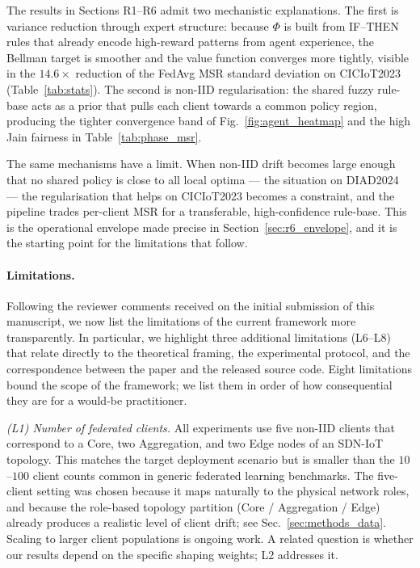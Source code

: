 \documentclass[ai,article,submit,moreauthors,pdftex]{Definitions/mdpi}
\newcommand{\rev}[1]{#1}
\begin{document}
The results in Sections R1--R6 admit two mechanistic explanations.
The first is variance reduction through expert structure: because
$\Phi$ is built from IF--THEN rules that already encode high-reward
patterns from agent experience, the Bellman target is smoother and
the value function converges more tightly, visible in the
$14.6\times$ reduction of the FedAvg MSR standard deviation on
CICIoT2023 (Table~\ref{tab:stats}). The second is non-IID
regularisation: the shared fuzzy rule-base acts as a prior that
pulls each client towards a common policy region, producing the
tighter convergence band of Fig.~\ref{fig:agent_heatmap} and the
high Jain fairness in Table~\ref{tab:phase_msr}.

The same mechanisms have a limit. When non-IID drift becomes large
enough that no shared policy is close to all local optima --- the
situation on DIAD2024 --- the regularisation that helps on
CICIoT2023 becomes a constraint, and the pipeline trades per-client
MSR for a transferable, high-confidence rule-base. This is the
operational envelope made precise in Section~\ref{sec:r6_envelope},
and it is the starting point for the limitations that follow.

\label{sec:limitations}
\paragraph{Limitations.} \rev{Following the reviewer comments received on the initial submission of this manuscript, we now list the limitations of the current framework more transparently. In particular, we highlight three additional limitations (L6--L8) that relate directly to the theoretical framing, the experimental protocol, and the correspondence between the paper and the released source code.} \rev{Eight} limitations bound the scope of the
framework; we list them in order of how consequential they are for a
would-be practitioner.

\emph{(L1) Number of federated clients.} All experiments use five
non-IID clients that correspond to a Core, two Aggregation, and two
Edge nodes of an SDN-IoT topology. This matches the target
deployment scenario but is smaller than the $10$--$100$ client
counts common in generic federated learning benchmarks. The
five-client setting was chosen because it maps naturally to the
physical network roles, and \rev{because the role-based topology partition (Core / Aggregation / Edge) already produces a realistic level of client drift; see Sec.~\ref{sec:methods_data}}. Scaling to larger client populations is ongoing
work. A related question is whether our results depend on the
specific shaping weights; L2 addresses it.
\end{document}
